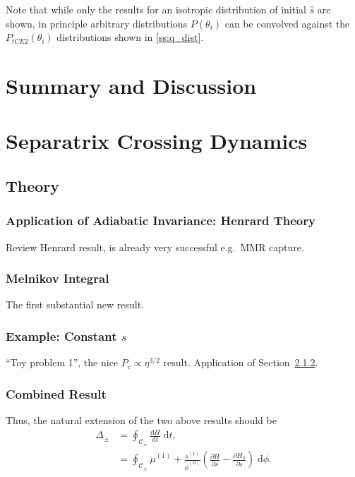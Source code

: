\documentclass[twocolumn]{aastex63}
\newcommand*{\rd}[2]{\frac{\mathrm{d}#1}{\mathrm{d}#2}}
\newcommand*{\pd}[2]{\frac{\partial#1}{\partial#2}}
\newcommand*{\p}[1]{\left(#1\right)}
\begin{document}
Note that while only the results for an isotropic distribution of initial
$\hat{s}$ are shown, in principle arbitrary distributions $P\p{\theta_i}$ can be
convolved against the $P_{tCE2}\p{\theta_i}$ distributions shown in
\autoref{ss:q_dist}.

\section{Summary and Discussion}\label{s:summary}




\appendix

\section{Separatrix Crossing Dynamics}

\subsection{Theory}\label{app:sep_crossing_dynamics}

\subsubsection{Application of Adiabatic Invariance: Henrard Theory}

Review Henrard result, is already very successful e.g.\ MMR capture.

\subsubsection{Melnikov Integral}\label{sss:Melnikov}

The first substantial new result.

\subsubsection{Example: Constant $s$}

``Toy problem 1'', the nice $P_c \propto \eta^{3/2}$ result. Application of
Section~\ref{sss:Melnikov}.

\subsubsection{Combined Result}

Thus, the natural extension of the two above results should be
\begin{align}
    \Delta_{\pm} &= \oint_{\mathcal{C}_{\pm}} \rd{H}{t}\;\mathrm{d}t,\\
        &= \oint_{\mathcal{C}_{\pm}}
            \dot{\mu}^{(1)} + \frac{\dot{s}^{(1)}}{\dot{\phi}^{(0)}}
                \p{\pd{H}{s} - \pd{H_4}{s}}\;\mathrm{d}\phi.
\end{align}
\end{document}
